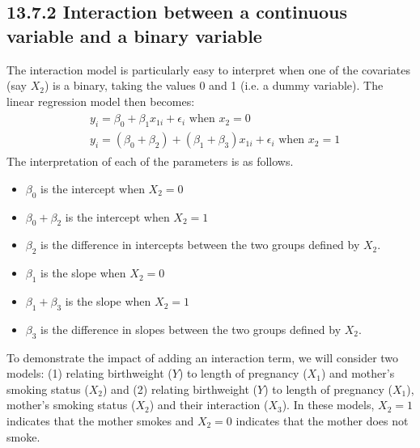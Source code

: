 \documentclass[letterpaper,10pt,english]{jupyterBook}
\begin{document}
\subsection{13.7.2 Interaction between a continuous variable and a binary variable}
\label{\detokenize{13.g. Linear Regression II:interaction-between-a-continuous-variable-and-a-binary-variable}}
\sphinxAtStartPar
The interaction model is particularly easy to interpret when one of the covariates (say \(X_2\)) is a binary, taking the values 0 and 1 (i.e. a dummy variable). The linear regression model then becomes:
\begin{equation*}
\begin{split}
\begin{align}
&y_i = \beta_0 + \beta_1x_{1i} + \epsilon_i \text{ when } x_2=0\\ 
&y_i = (\beta_0 + \beta_2) + (\beta_1+\beta_3)x_{1i} + \epsilon_i \text{ when } x_2=1 
\end{align}
\end{split}
\end{equation*}
\sphinxAtStartPar
The interpretation of each of the parameters is as follows.
\begin{itemize}
\item {} 
\sphinxAtStartPar
\(\beta_0\) is the intercept when \(X_2=0\)

\item {} 
\sphinxAtStartPar
\(\beta_0 + \beta_2\) is the intercept when \(X_2=1\)

\item {} 
\sphinxAtStartPar
\(\beta_2\) is the difference in intercepts between the two groups defined by \(X_2\).

\item {} 
\sphinxAtStartPar
\(\beta_1\) is the slope when \(X_2=0\)

\item {} 
\sphinxAtStartPar
\(\beta_1+\beta_3\) is the slope when \(X_2=1\)

\item {} 
\sphinxAtStartPar
\(\beta_3\) is the difference in slopes between the two groups defined by \(X_2\).

\end{itemize}

\sphinxAtStartPar
{} To demonstrate the impact of adding an interaction term, we will consider two models: (1) relating birthweight (\(Y\)) to length of pregnancy (\(X_1\)) and mother’s smoking status (\(X_2\)) and (2) relating birthweight (\(Y\)) to length of pregnancy (\(X_1\)), mother’s smoking status (\(X_2\)) and their interaction (\(X_3\)). In these models, \(X_2=1\) indicates that the mother smokes and \(X_2=0\) indicates that the mother does not smoke.
\end{document}
